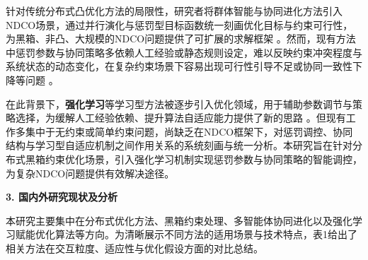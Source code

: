 \begin{titlepage}
\par
\indent
针对传统分布式凸优化方法的局限性，研究者将群体智能与协同进化方法引入NDCO场景，通过并行演化与惩罚型目标函数统一刻画优化目标与约束可行性，为黑箱、非凸、大规模的NDCO问题提供了可扩展的求解框架 \cite{chen2020,potter1994,omidvar2014}。然而，现有方法中惩罚参数与协同策略多依赖人工经验或静态规则设定，难以反映约束冲突程度与系统状态的动态变化，在复杂约束场景下容易出现可行性引导不足或协同一致性下降等问题 \cite{li2012pso,yang2008,mezuramontes2011}。

\par
\indent
在此背景下，\textbf{强化学习}等学习型方法被逐步引入优化领域，用于辅助参数调节与策略选择，为缓解人工经验依赖、提升算法自适应能力提供了新的思路 \cite{wang2014,karafotias2015}。但现有工作多集中于无约束或简单约束问题，尚缺乏在NDCO框架下，对惩罚调控、协同结构与学习型自适应机制之间作用关系的系统刻画与统一分析。本研究旨在针对分布式黑箱约束优化场景，引入强化学习机制实现惩罚参数与协同策略的智能调控，为复杂NDCO问题提供有效解决途径。

\noindent 
\textbf{3. 国内外研究现状及分析}

\par
\indent
本研究主要集中在分布式优化方法、黑箱约束处理、多智能体协同进化以及强化学习赋能优化算法等方向。为清晰展示不同方法的适用场景与技术特点，表1给出了相关方法在交互粒度、适应性与优化假设方面的对比总结。

\begin{table}[H]
\centering
\caption{分布式约束优化相关方法对比}
\label{tab:related_methods}
\small
\setlength{\tabcolsep}{3pt}
\end{table}


\end{titlepage}
